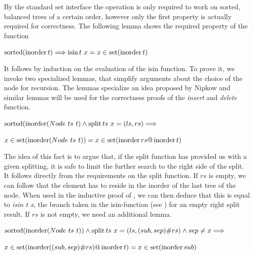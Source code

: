 By the standard set interface the operation is only required to work on
sorted, balanced trees of a certain order, however only the first property
is actually required for correctness.
The following lemma shows the required property of the function

\begin{theorem}
    \label{thm:isin-set}
    $\operatorname{sorted} (\operatorname{inorder} t) \Longrightarrow \operatorname{isin} t\ x = x \in \operatorname{set} (\operatorname{inorder} t)$
\end{theorem}

It follows by induction on the evaluation of the isin function.
To prove it, we invoke two specialized lemmas,
that simplify arguments about the choice of the node for recursion.
The lemmas specialize an idea proposed by Nipkow \parencite{DBLP:conf/itp/Nipkow16}
and similar lemmas will be used for the correctness proofs of 
the \textit{insert} and \textit{delete} function.

\begin{lemma} $\operatorname{sorted} (\operatorname{inorder} (Node\ ts\ t) \wedge \operatorname{split} ts\ x = (ls, rs) \Longrightarrow$ \\
    \begin{center}
    $x \in \operatorname{set} (\operatorname{inorder} (Node\ ts\ t)) = x \in \operatorname{set} (\operatorname{inorder} rs @ \operatorname{inorder} t)$
    \end{center}
\end{lemma}

The idea of this fact is to argue that, if the split function has provided
us with a given splitting, it is safe to limit the further search
to the right side of the split.
It follows directly from the requirements on the split function.
If $rs$ is empty, we can follow that the element has to reside in the inorder
of the last tree of the node.
When used in the inductive proof of , we can then deduce that this is
equal to \textit{isin t x}, the branch taken in the isin-function
(see ) for an empty right split result.
If $rs$ is not empty, we need an additional lemma.

\begin{lemma}
    $\operatorname{sorted} (\operatorname{inorder} (Node\ ts\ t)) \wedge \operatorname{split} ts\ x = (ls, (sub,sep)\#rs) \wedge sep \neq x \Longrightarrow$ \\
    \begin{center}
    $x \in \operatorname{set} (\operatorname{inorder} ((sub,sep)\#rs) @ \operatorname{inorder} t) = x \in \operatorname{set} (\operatorname{inorder} sub)$
    \end{center}
\end{lemma}

